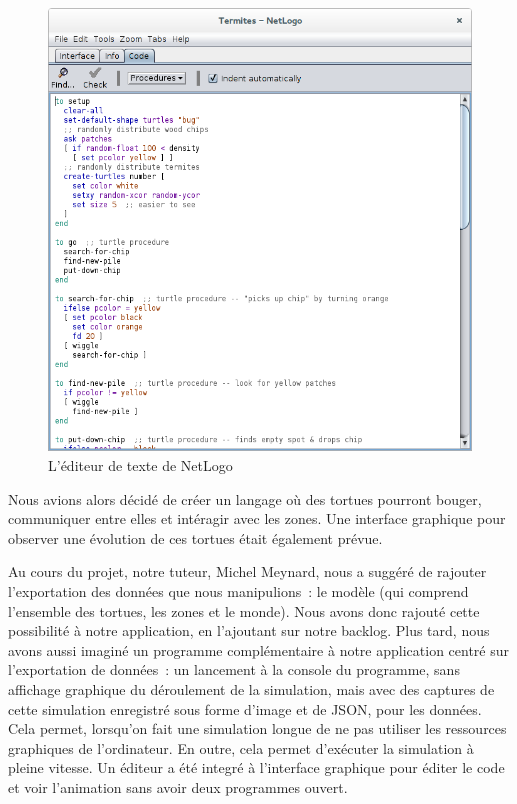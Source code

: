 \begin{figure}[h]
\centering
\includegraphics[scale=0.3]{doc/gestionProjet/netlogo-code.png}
\caption{\label{netlogo-code} L'éditeur de texte de NetLogo}
\end{figure}


Nous avions alors décidé de créer un langage où des tortues pourront bouger, communiquer entre elles et intéragir avec les zones. Une interface graphique pour observer une évolution de ces tortues était également prévue.

Au cours du projet, notre tuteur, Michel Meynard, nous a suggéré de rajouter l'exportation des données que nous manipulions~: le modèle (qui comprend l'ensemble des tortues, les zones et le monde). Nous avons donc rajouté cette possibilité à notre application, en l'ajoutant sur notre backlog.
Plus tard, nous avons aussi imaginé un programme complémentaire à notre application centré sur l'exportation de données~: un lancement à la console du programme, sans affichage graphique du déroulement de la simulation, mais avec des captures de cette simulation enregistré sous forme d'image et de JSON, pour les données.
Cela permet, lorsqu'on fait une simulation longue de ne pas utiliser les ressources graphiques de l'ordinateur. En outre, cela permet d'exécuter la simulation à pleine vitesse.
Un éditeur a été integré à l'interface graphique pour éditer le code et voir l'animation sans avoir deux programmes ouvert.

